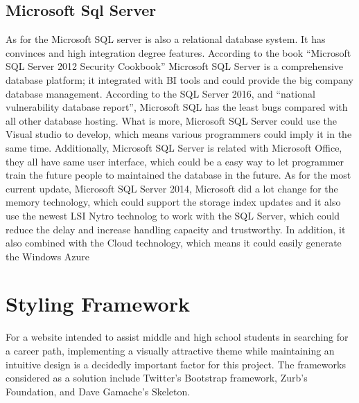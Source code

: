 \documentclass[letterpaper,10pt, draftclsnofoot,onecolumn]{IEEEtran}
\begin{document}
{{{{{{{\subsection[Microsoft Sql Server]{\color{black}
Microsoft Sql Server}
{\color{black}\normalsize\noindent
{As for the Microsoft SQL server is also a relational database system. It has convinces and high integration degree features.
According to the book “Microsoft SQL Server 2012 Security Cookbook”\cite{IEEEexample:book5} Microsoft SQL Server is a comprehensive database platform; it integrated with BI tools and could provide the big company database management.
According to the SQL Server 2016, and “national vulnerability database report”, Microsoft SQL has the least bugs compared with all other database hosting. What is more, Microsoft SQL Server could use the Visual studio to develop, which means various programmers could imply it in the same time. 
Additionally, Microsoft SQL Server is related with Microsoft Office, they all have same user interface, which could be a easy way to let programmer train the future people to maintained the database in the future. As for the most current update, Microsoft SQL Server 2014, Microsoft did a lot change for the memory technology, which could support the storage index updates and it also use the newest LSI Nytro technolog to work with the SQL Server, which could reduce the delay and increase handling capacity and trustworthy. 
In addition, it also combined with the Cloud technology, which means it could easily generate the Windows Azure
}


\section[Styling Framework]{\color{black}
Styling Framework}
{\color{black}\normalsize\noindent
{For a website intended to assist middle and high school students in searching for a career path, implementing a visually attractive theme while maintaining an intuitive design is a decidedly important factor for this project. The frameworks considered as a solution include Twitter's Bootstrap framework, Zurb's Foundation, and Dave Gamache's Skeleton.}

}}}}}}}}}
\end{document}
